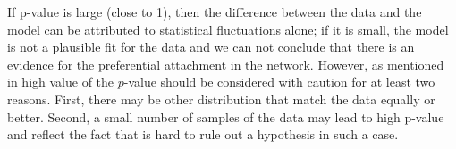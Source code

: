  If  p-value is large (close to 1), then the difference between the data and the model can be attributed to statistical fluctuations alone; if it is small, the model is not a plausible fit for the data and we can not conclude that there is an evidence for the preferential attachment in the network. 
However, as mentioned in \cite{clauset2009power} high value of the $p$-value should be considered with caution for at least two reasons. First, there may be other distribution that match the data equally or better. Second, a small number of samples of the data may lead to high p-value and reflect the fact that is hard to rule out a hypothesis in such a case.


